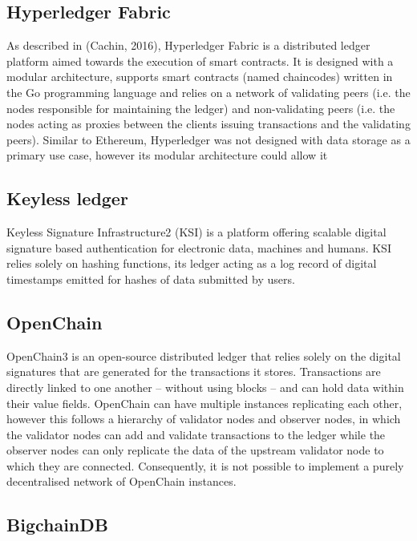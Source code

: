 \documentclass{tnreport}
\begin{document}
\subsection{Hyperledger Fabric}

As described in (Cachin, 2016), Hyperledger Fabric is a distributed ledger platform aimed towards the execution of smart contracts. It is designed with a modular architecture, supports smart contracts (named chaincodes) written in the Go programming language and relies on a network of validating peers (i.e. the nodes responsible for maintaining the ledger) and non-validating peers (i.e. the nodes acting as proxies between the clients issuing transactions and the validating peers).
Similar to Ethereum, Hyperledger was not designed with data storage as a primary use case, however its modular architecture could allow it

\subsection{Keyless ledger}

Keyless Signature Infrastructure2 (KSI) is a platform offering scalable digital signature based authentication for electronic data, machines and humans. KSI relies solely on hashing functions, its ledger acting as a log record of digital timestamps emitted for hashes of data submitted by users.

\subsection{OpenChain}

OpenChain3 is an open-source distributed ledger that relies solely on the digital signatures that are generated for the transactions it stores. Transactions are directly linked to one another – without using blocks – and can hold data within their value fields.
OpenChain can have multiple instances replicating each other, however this follows a hierarchy of validator nodes and observer nodes, in which the validator nodes can add and validate transactions to the ledger while the observer nodes can only replicate the data of the upstream validator node to which they are connected. Consequently, it is not possible to implement a purely decentralised network of OpenChain instances.

\subsection{BigchainDB}
\end{document}

